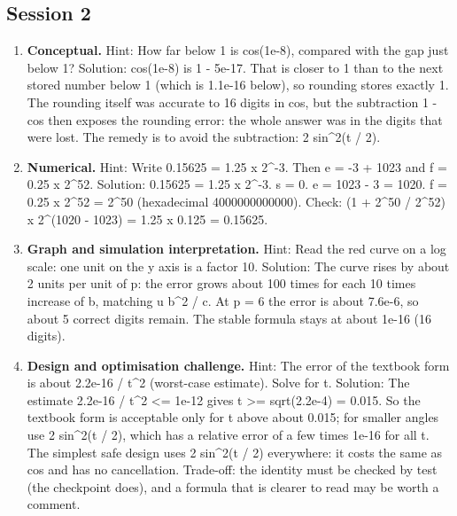 \documentclass[11pt,a4paper]{article}
\begin{document}
\subsection*{Session 2}
\begin{enumerate}[nosep]
\item \textbf{Conceptual.} Hint: How far below 1 is cos(1e-8), compared with the gap just below 1? Solution: cos(1e-8) is 1 - 5e-17. That is closer to 1 than to the next stored number below 1 (which is 1.1e-16 below), so rounding stores exactly 1. The rounding itself was accurate to 16 digits in cos, but the subtraction 1 - cos then exposes the rounding error: the whole answer was in the digits that were lost. The remedy is to avoid the subtraction: 2 sin\textasciicircum{}2(t / 2).
\item \textbf{Numerical.} Hint: Write 0.15625 = 1.25 x 2\textasciicircum{}-3. Then e = -3 + 1023 and f = 0.25 x 2\textasciicircum{}52. Solution: 0.15625 = 1.25 x 2\textasciicircum{}-3. s = 0. e = 1023 - 3 = 1020. f = 0.25 x 2\textasciicircum{}52 = 2\textasciicircum{}50 (hexadecimal 4000000000000). Check: (1 + 2\textasciicircum{}50 / 2\textasciicircum{}52) x 2\textasciicircum{}(1020 - 1023) = 1.25 x 0.125 = 0.15625.
\item \textbf{Graph and simulation interpretation.} Hint: Read the red curve on a log scale: one unit on the y axis is a factor 10. Solution: The curve rises by about 2 units per unit of p: the error grows about 100 times for each 10 times increase of b, matching u b\textasciicircum{}2 / c. At p = 6 the error is about 7.6e-6, so about 5 correct digits remain. The stable formula stays at about 1e-16 (16 digits).
\item \textbf{Design and optimisation challenge.} Hint: The error of the textbook form is about 2.2e-16 / t\textasciicircum{}2 (worst-case estimate). Solve for t. Solution: The estimate 2.2e-16 / t\textasciicircum{}2 \textless{}= 1e-12 gives t \textgreater{}= sqrt(2.2e-4) = 0.015. So the textbook form is acceptable only for t above about 0.015; for smaller angles use 2 sin\textasciicircum{}2(t / 2), which has a relative error of a few times 1e-16 for all t. The simplest safe design uses 2 sin\textasciicircum{}2(t / 2) everywhere: it costs the same as cos and has no cancellation. Trade-off: the identity must be checked by test (the checkpoint does), and a formula that is clearer to read may be worth a comment.
\end{enumerate}
\end{document}
